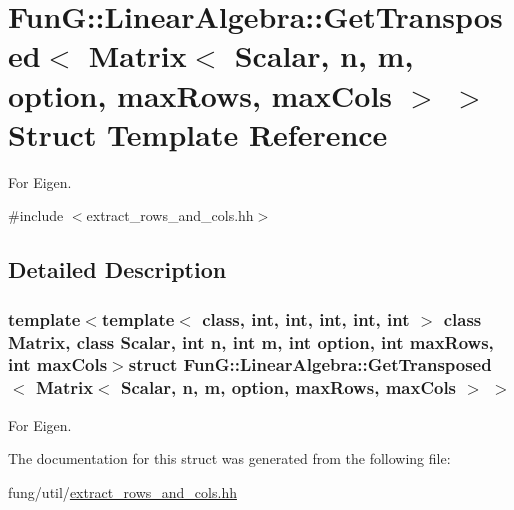 \hypertarget{structFunG_1_1LinearAlgebra_1_1GetTransposed_3_01Matrix_3_01Scalar_00_01n_00_01m_00_01option_00_837706e7e2f5ff6060578b88ee4bef60}{\section{\-Fun\-G\-:\-:\-Linear\-Algebra\-:\-:\-Get\-Transposed$<$ \-Matrix$<$ \-Scalar, n, m, option, max\-Rows, max\-Cols $>$ $>$ \-Struct \-Template \-Reference}
\label{structFunG_1_1LinearAlgebra_1_1GetTransposed_3_01Matrix_3_01Scalar_00_01n_00_01m_00_01option_00_837706e7e2f5ff6060578b88ee4bef60}
}


\-For \-Eigen.  




{\ttfamily \#include $<$extract\-\_\-rows\-\_\-and\-\_\-cols.\-hh$>$}



\subsection{\-Detailed \-Description}
\subsubsection*{template$<$template$<$ class, int, int, int, int, int $>$ class \-Matrix, class Scalar, int n, int m, int option, int max\-Rows, int max\-Cols$>$struct Fun\-G\-::\-Linear\-Algebra\-::\-Get\-Transposed$<$ Matrix$<$ Scalar, n, m, option, max\-Rows, max\-Cols $>$ $>$}

\-For \-Eigen. 

\-The documentation for this struct was generated from the following file\-:\begin{DoxyCompactItemize}
\item 
fung/util/\hyperlink{extract__rows__and__cols_8hh}{extract\-\_\-rows\-\_\-and\-\_\-cols.\-hh}\end{DoxyCompactItemize}
